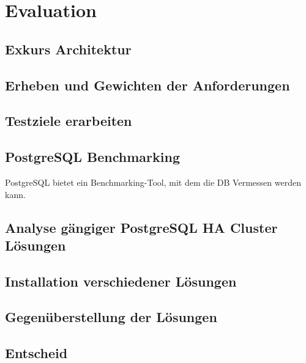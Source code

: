 
\section{Evaluation}
\subsection{Exkurs Architektur}





\subsection{Erheben und Gewichten der Anforderungen}

\subsection{Testziele erarbeiten}
\subsection{PostgreSQL Benchmarking}
PostgreSQL bietet ein Benchmarking-Tool,\cite{TYJFF7AB,VXNYQFTE} mit dem die DB Vermessen werden kann.
\subsection{Analyse gängiger PostgreSQL HA Cluster Lösungen}









\subsection{Installation verschiedener Lösungen}






\subsection{Gegenüberstellung der Lösungen}

\subsection{Entscheid}